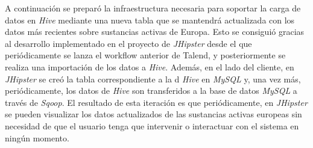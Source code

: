 \par
A continuación se preparó la infraestructura necesaria para soportar la carga de datos en \textit{Hive} mediante una nueva tabla que se mantendrá actualizada con los datos más recientes sobre sustancias activas de Europa. Esto se consiguió gracias al desarrollo implementado en el proyecto de \textit{JHipster} desde el que periódicamente se lanza el workflow anterior de Talend, y posteriormente se realiza una importación de los datos a \textit{Hive}. Además, en el lado del cliente, en \textit{JHipster} se creó la tabla correspondiente a la d \textit{Hive} en \textit{MySQL} y, una vez más, periódicamente, los datos de \textit{Hive} son transferidos a la base de datos \textit{MySQL} a través de \textit{Sqoop}. El resultado de esta iteración es que periódicamente, en \textit{JHipster} se pueden visualizar los datos actualizados de las sustancias activas europeas sin necesidad de que el usuario tenga que intervenir o interactuar con el sistema en ningún momento. 


\bigskip

